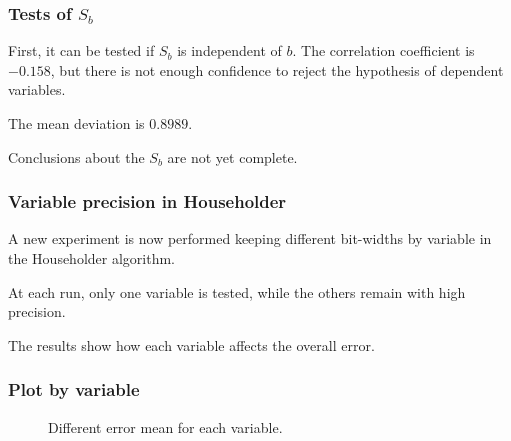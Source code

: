 \documentclass[serif, 12pt]{beamer}
\begin{document}

\begin{frame}

\frametitle{Tests of $S_b$}

First, it can be tested if $S_b$ is independent of $b$. The correlation 
coefficient is $-0.158$, but there is not enough confidence to reject the 
hypothesis of dependent variables.

\vspace{1em}

The mean deviation is $0.8989$.

\vspace{1em}

Conclusions about the $S_b$ are not yet complete.


\end{frame}


\begin{frame}

\frametitle{Variable precision in Householder}

A new experiment is now performed keeping different bit-widths by variable in 
the Householder algorithm.

\vspace{1em}

At each run, only one variable is tested, while the others remain with high 
precision.

\vspace{1em}

The results show how each variable affects the overall error.

\end{frame}


\begin{frame}

\frametitle{Plot by variable}

\begin{figure}[h]
	\caption{Different error mean for each variable.}
	\label{fig:errhh}
\end{figure}


\end{frame}

\end{document}
